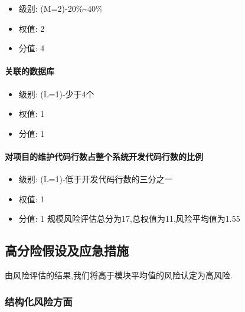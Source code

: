 \documentclass[hyperref, a4paper]{ctexart}
\providecommand{\tightlist}{%
  \setlength{\itemsep}{0pt}\setlength{\parskip}{0pt}}
\let\oldparagraph\paragraph
\renewcommand{\paragraph}[1]{\oldparagraph{#1}\mbox{}}
\begin{document}
\begin{itemize}
\tightlist
\item
  级别: (M=2)-20\%\textasciitilde40\%
\item
  权值: 2
\item
  分值: 4
\end{itemize}

\hypertarget{ux5173ux8054ux7684ux6570ux636eux5e93}{%
\paragraph{关联的数据库}\label{ux5173ux8054ux7684ux6570ux636eux5e93}}

\begin{itemize}
\tightlist
\item
  级别: (L=1)-少于4个
\item
  权值: 1
\item
  分值: 1
\end{itemize}

\hypertarget{ux5bf9ux9879ux76eeux7684ux7ef4ux62a4ux4ee3ux7801ux884cux6570ux5360ux6574ux4e2aux7cfbux7edfux5f00ux53d1ux4ee3ux7801ux884cux6570ux7684ux6bd4ux4f8b}{%
\paragraph{对项目的维护代码行数占整个系统开发代码行数的比例}\label{ux5bf9ux9879ux76eeux7684ux7ef4ux62a4ux4ee3ux7801ux884cux6570ux5360ux6574ux4e2aux7cfbux7edfux5f00ux53d1ux4ee3ux7801ux884cux6570ux7684ux6bd4ux4f8b}}

\begin{itemize}
\tightlist
\item
  级别: (L=1)-低于开发代码行数的三分之一
\item
  权值: 1
\item
  分值: 1 \newline 规模风险评估总分为17,总权值为11,风险平均值为1.55
\end{itemize}

\hypertarget{ux9ad8ux5206ux9669ux5047ux8bbeux53caux5e94ux6025ux63aaux65bd}{%
\subsection{高分险假设及应急措施}\label{ux9ad8ux5206ux9669ux5047ux8bbeux53caux5e94ux6025ux63aaux65bd}}

由风险评估的结果,我们将高于模块平均值的风险认定为高风险.

\hypertarget{ux7ed3ux6784ux5316ux98ceux9669ux65b9ux9762}{%
\subsubsection{结构化风险方面}\label{ux7ed3ux6784ux5316ux98ceux9669ux65b9ux9762}}
\end{document}
